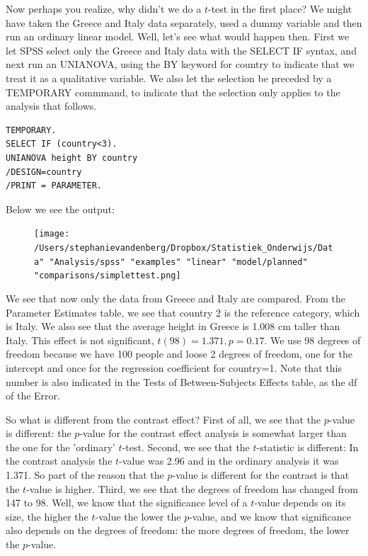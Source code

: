\documentclass[]{report}\usepackage[]{graphicx}\usepackage[]{color}
\begin{document}
Now perhaps you realize, why didn't we do a $t$-test in the first place? We might have taken the Greece and Italy data separately, used a dummy variable and then run an ordinary linear model. Well, let's see what would happen then.
First we let SPSS select only the Greece and Italy data with the SELECT IF syntax, and next run an UNIANOVA, using the BY keyword for country to indicate that we treat it as a qualitative variable. We also let the selection be preceded by a TEMPORARY commmand, to indicate that the selection only applies to the analysis that follows.

\begin{verbatim}
TEMPORARY.
SELECT IF (country<3).
UNIANOVA height BY country
/DESIGN=country
/PRINT = PARAMETER.  
\end{verbatim}


Below we see the output:
\begin{figure}[h]
    \begin{center}
       \texttt{[image: /Users/stephanievandenberg/Dropbox/Statistiek\_Onderwijs/Data" "Analysis/spss" "examples" "linear" "model/planned" "comparisons/simplettest.png]}
    \end{center}
\end{figure}

We see that now only the data from Greece and Italy are compared. From the Parameter Estimates table, we see that country 2 is the reference category, which is Italy. We also see that the average height in Greece is 1.008 cm taller than Italy. This effect is not significant, $t(98)=1.371,p=0.17$. We use 98 degrees of freedom because we have 100 people and loose 2 degrees of freedom, one for the intercept and once for the regression coefficient for country=1. Note that this number is also indicated in the Tests of Between-Subjects Effects table, as the df of the Error. 

So what is different from the contrast effect? First of all, we see that the $p$-value is different: the $p$-value for the contrast effect analysis is somewhat larger than the one for the 'ordinary' $t$-test. Second, we see that the $t$-statistic is different: In the contrast analysis the $t$-value was 2.96 and in the ordinary analysis it was 1.371. So part of the reason that the $p$-value is different for the contrast is that the $t$-value is higher. Third, we see that the degrees of freedom has changed from 147 to 98. Well, we know that the significance level of a $t$-value depends on its size, the higher the $t$-value the lower the $p$-value, and we know that significance also depends on the degrees of freedom: the more degrees of freedom, the lower the $p$-value. 
\end{document}
